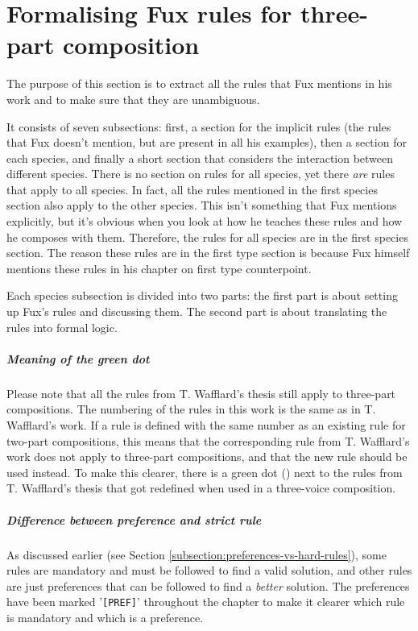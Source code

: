 \chapter{Formalising Fux rules for three-part composition}\label{chapter:species}
The purpose of this section is to extract all the rules that Fux mentions in his work and to make sure that they are unambiguous.

It consists of seven subsections: first, a section for the implicit rules (the rules that Fux doesn't mention, but are present in all his examples), then a section for each species, and finally a short section that considers the interaction between different species. There is no section on rules for all species, yet there \textit{are} rules that apply to all species. In fact, all the rules mentioned in the first species section also apply to the other species. This isn't something that Fux mentions explicitly, but it's obvious when you look at how he teaches these rules and how he composes with them. Therefore, the rules for all species are in the first species section. The reason these rules are in the first type section is because Fux himself mentions these rules in his chapter on first type counterpoint.

Each species subsection is divided into two parts: the first part is about setting up Fux's rules and discussing them. The second part is about translating the rules into formal logic.

\paragraph{Meaning of the green dot}
Please note that all the rules from T. Wafflard's thesis still apply to three-part compositions. The numbering of the rules in this work is the same as in T. Wafflard's work. If a rule is defined with the same number as an existing rule for two-part compositions, this means that the corresponding rule from T. Wafflard's work does not apply to three-part compositions, and that the new rule should be used instead. To make this clearer, there is a green dot (\greendot) next to the rules from T. Wafflard's thesis that got redefined when used in a three-voice composition.

\paragraph{Difference between preference and strict rule}
As discussed earlier (see Section \ref{subsection:preferences-vs-hard-rules}), some rules are mandatory and must be followed to find a valid solution, and other rules are just preferences that can be followed to find a \textit{better} solution. The preferences have been marked '\texttt{[PREF]}' throughout the chapter to make it clearer which rule is mandatory and which is a preference.

